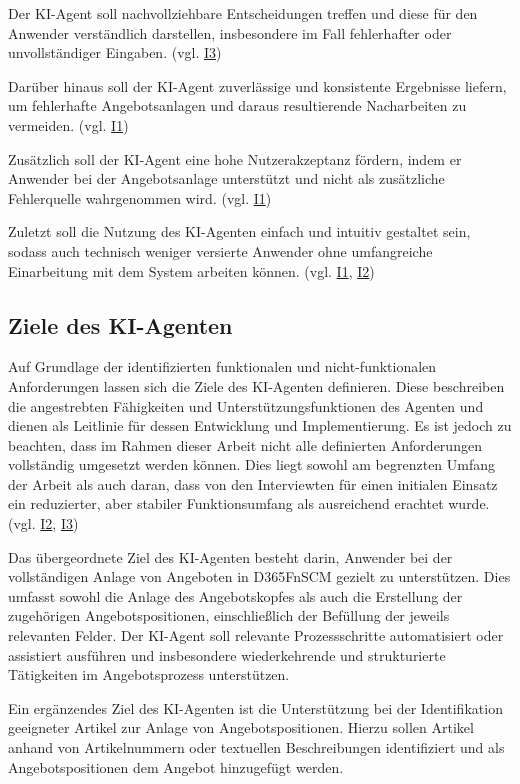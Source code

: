 Der \ac{KI}-Agent soll nachvollziehbare Entscheidungen treffen und diese für den Anwender verständlich darstellen, insbesondere im Fall fehlerhafter oder unvollständiger Eingaben. (vgl. \hyperref[anhang:i3]{I3})

Darüber hinaus soll der \ac{KI}-Agent zuverlässige und konsistente Ergebnisse liefern, um fehlerhafte Angebotsanlagen und daraus resultierende Nacharbeiten zu vermeiden. (vgl. \hyperref[anhang:i1]{I1})

Zusätzlich soll der \ac{KI}-Agent eine hohe Nutzerakzeptanz fördern, indem er Anwender bei der Angebotsanlage unterstützt und nicht als zusätzliche Fehlerquelle wahrgenommen wird. (vgl. \hyperref[anhang:i1]{I1})

Zuletzt soll die Nutzung des \ac{KI}-Agenten einfach und intuitiv gestaltet sein, sodass auch technisch weniger versierte Anwender ohne umfangreiche Einarbeitung mit dem System arbeiten können. (vgl. \hyperref[anhang:i1]{I1}, \hyperref[anhang:i2]{I2})

\subsection{Ziele des KI-Agenten}
\label{sec:ziele}

Auf Grundlage der identifizierten funktionalen und nicht-funktionalen Anforderungen lassen sich die Ziele des \ac{KI}-Agenten definieren. Diese beschreiben die angestrebten Fähigkeiten und Unterstützungsfunktionen des Agenten und dienen als Leitlinie für dessen Entwicklung und Implementierung. Es ist jedoch zu beachten, dass im Rahmen dieser Arbeit nicht alle definierten Anforderungen vollständig umgesetzt werden können. Dies liegt sowohl am begrenzten Umfang der Arbeit als auch daran, dass von den Interviewten für einen initialen Einsatz ein reduzierter, aber stabiler Funktionsumfang als ausreichend erachtet wurde. (vgl. \hyperref[anhang:i2]{I2}, \hyperref[anhang:i3]{I3})

Das übergeordnete Ziel des \ac{KI}-Agenten besteht darin, Anwender bei der vollständigen Anlage von Angeboten in \ac{D365FnSCM} gezielt zu unterstützen. Dies umfasst sowohl die Anlage des Angebotskopfes als auch die Erstellung der zugehörigen Angebotspositionen, einschließlich der Befüllung der jeweils relevanten Felder. Der \ac{KI}-Agent soll relevante Prozessschritte automatisiert oder assistiert ausführen und insbesondere wiederkehrende und strukturierte Tätigkeiten im Angebotsprozess unterstützen.

Ein ergänzendes Ziel des \ac{KI}-Agenten ist die Unterstützung bei der Identifikation geeigneter Artikel zur Anlage von Angebotspositionen. Hierzu sollen Artikel anhand von Artikelnummern oder textuellen Beschreibungen identifiziert und als Angebotspositionen dem Angebot hinzugefügt werden.

